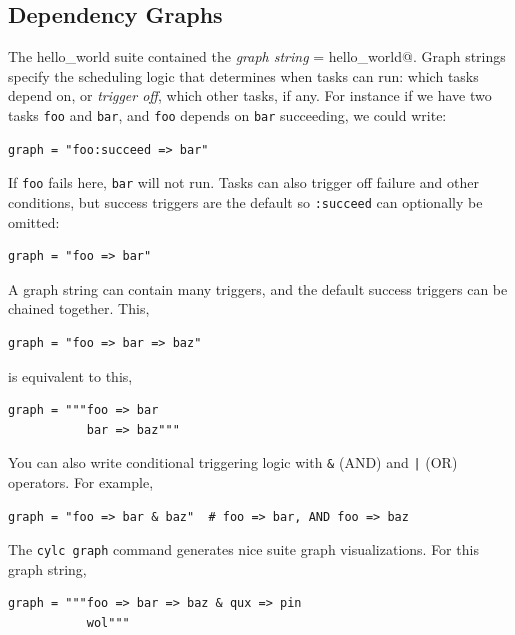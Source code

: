 \subsection{Dependency Graphs}

The hello\_world suite contained the {\em graph string}
\lstinline@graph = hello_world@.  Graph strings specify the scheduling logic
that determines when tasks can run: which tasks depend on, or {\em trigger off},
which other tasks, if any.  For instance if we have two tasks \lstinline{foo}
and \lstinline{bar}, and \lstinline{foo} depends on \lstinline{bar} succeeding,
we could write:

\begin{lstlisting}[language=suiterc]
graph = "foo:succeed => bar"
\end{lstlisting}

If \lstinline{foo} fails here, \lstinline{bar} will not run.  Tasks can also
trigger off failure and other conditions, but success triggers are the default
so \lstinline=:succeed= can optionally be omitted:

\begin{lstlisting}[language=suiterc]
graph = "foo => bar"
\end{lstlisting}

A graph string can contain many triggers, and the default success triggers can
be chained together. This,

\begin{lstlisting}[language=suiterc]
graph = "foo => bar => baz"
\end{lstlisting}

is equivalent to this,

\begin{lstlisting}[language=suiterc]
graph = """foo => bar
           bar => baz"""
\end{lstlisting}

You can also write conditional triggering logic with \lstinline=&= (AND) and
\lstinline=|= (OR) operators. For example,

\begin{lstlisting}[language=suiterc]
graph = "foo => bar & baz"  # foo => bar, AND foo => baz
\end{lstlisting}

The \lstinline=cylc graph= command generates nice suite graph visualizations.
For this graph string,

\begin{lstlisting}[language=suiterc]
graph = """foo => bar => baz & qux => pin
           wol"""
\end{lstlisting}

